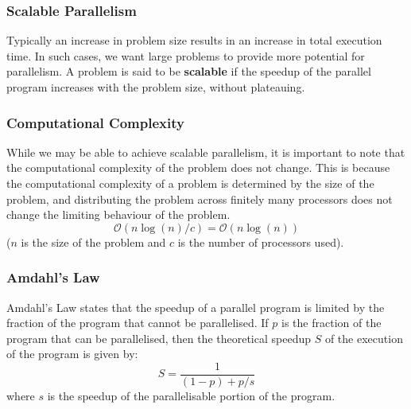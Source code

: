 \documentclass{article}
\begin{document}
\subsubsection{Scalable Parallelism}
Typically an increase in problem size results in an increase in total
execution time. In such cases, we want large problems to provide more
potential for parallelism. A problem is said to be \textbf{scalable} if
the speedup of the parallel program increases with the problem size,
without plateauing.
\subsubsection{Computational Complexity}
While we may be able to achieve scalable parallelism, it is important
to note that the computational complexity of the problem does not
change. This is because the computational complexity of a problem is
determined by the size of the problem, and distributing the problem
across finitely many processors does not change the limiting behaviour
of the problem.
\begin{equation*}
    \mathcal{O}\left( n \log{\left( n \right)} / c \right) = \mathcal{O}\left( n \log{\left( n \right)} \right)
\end{equation*}
(\(n\) is the size of the problem and \(c\) is the number of
processors used).
\subsubsection{Amdahl's Law}
Amdahl's Law states that the speedup of a parallel program is limited
by the fraction of the program that cannot be parallelised. If \(p\) is
the fraction of the program that can be parallelised, then the
theoretical speedup \(S\) of the execution of the program is given by:
\begin{equation}
    S = \frac{1}{\left( 1 - p \right) + p/s}
\end{equation}
where \(s\) is the speedup of the parallelisable portion of the program.
\end{document}
